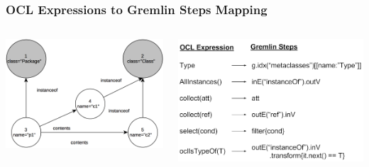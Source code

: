 \documentclass[10pt]{beamer}
\begin{document}
\begin{frame}[c]\frametitle{OCL Expressions to Gremlin Steps Mapping}
	\begin{columns}
		\begin{column}{0.5\textwidth}
      \begin{center}
        \includegraphics[width=\textwidth]{mogwai-graph.png}
      \end{center}			
		\end{column}
		\begin{column}{0.5\textwidth}
      \begin{center}
        \includegraphics[width=\textwidth]{mogwai-mapping.png}
      \end{center}			
		\end{column}
	\end{columns}
\end{frame}
\end{document}
